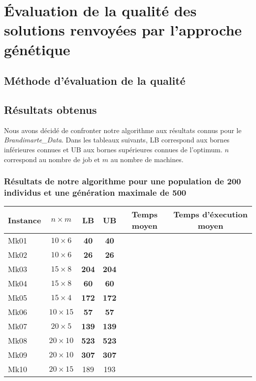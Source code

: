 \section{Évaluation de la qualité des solutions renvoyées par l'approche génétique}

\subsection{Méthode d'évaluation de la qualité}



\subsection{Résultats obtenus}

Nous avons décidé de confronter notre algorithme aux résultats connus pour le \textit{Brandimarte_Data}. Dans les tableaux suivants, LB correspond aux bornes inférieures connues et UB aux bornes supérieures connues de l'optimum. $n$ correspond au nombre de job et $m$ au nombre de machines.

\subsubsection{Résultats de notre algorithme pour une population de 200 individus et une génération maximale de 500}

\begin{table}[!h]
    \renewcommand{\arraystretch}{1.5}
    \centering
    \begin{tabular}{p{} c c c c c}
        Instance & $n \times m$ & LB & UB & Temps moyen & Temps d'éxecution moyen \\
         \hline
        Mk01 & $10 \times 6$ & \textbf{40} & \textbf{40} & & \\
         \hline
        Mk02 & $10 \times 6$ & \textbf{26} & \textbf{26} & & \\
         \hline
        Mk03 & $15 \times 8$ & \textbf{204} & \textbf{204} & & \\
         \hline
        Mk04 & $15 \times 8$ & \textbf{60} & \textbf{60} & & \\
         \hline
        Mk05 & $15 \times 4$ & \textbf{172} & \textbf{172} & & \\
         \hline
        Mk06 & $10 \times 15$ & \textbf{57} & \textbf{57} & & \\
         \hline
        Mk07 & $20 \times 5$ & \textbf{139} & \textbf{139} & & \\
         \hline
        Mk08 & $20 \times 10$ & \textbf{523} & \textbf{523} & & \\
         \hline
        Mk09 & $20 \times 10$ & \textbf{307} & \textbf{307} & & \\
         \hline
        Mk10 & $20 \times 15$ & 189 & 193 \\
         \hline 
    \end{tabular}
\end{table}

